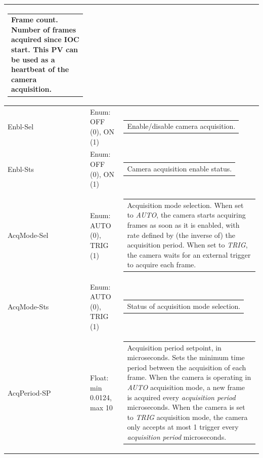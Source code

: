 \documentclass[openany]{article}
\begin{document}
\begin{longtable}{| m{3.0cm} m{4.5cm}  m{7.0cm} |}
\begin{tabular}{@{}m{6cm}@{}}
                Frame count. Number of frames acquired since IOC start. This PV
                can be used as a heartbeat of the camera acquisition.
            \end{tabular} \hypertarget{pv:enbl}{}\\ \hline
        Enbl-Sel & Enum: OFF (0), ON (1) & \begin{tabular}{@{}m{6cm}@{}}
                Enable/disable camera acquisition.
            \end{tabular} \\ \hline
        Enbl-Sts & Enum: OFF (0), ON (1) & \begin{tabular}{@{}m{6cm}@{}}
                Camera acquisition enable status.
            \end{tabular} \hypertarget{pv:acq-mode}{}\\ \hline
        AcqMode-Sel & Enum: AUTO (0), TRIG (1) & \begin{tabular}{@{}m{6cm}@{}}
                Acquisition mode selection. When set to \emph{AUTO}, the camera
                starts acquiring frames as soon as it is enabled, with rate defined
                by (the inverse of) the acquisition period. When set to \emph{TRIG},
                the camera waits for an external trigger to acquire each frame.
            \end{tabular} \\ \hline
        AcqMode-Sts & Enum: AUTO (0), TRIG (1) & \begin{tabular}{@{}m{6cm}@{}}
                Status of acquisition mode selection.
            \end{tabular} \hypertarget{pv:acq-period}{}\\ \hline
        AcqPeriod-SP & Float: min 0.0124, max 10 & \begin{tabular}{@{}m{6cm}@{}}
                Acquisition period setpoint, in microseconds. Sets the minimum time period
                between the acquisition of each frame. When the camera is operating in 
                \emph{AUTO} acquisition mode, a new frame is acquired every 
                \emph{acquisition period} microseconds. When the camera is set to
                \emph{TRIG} acquisition mode, the camera only accepts at most 1
                trigger every \emph{acquisition period} microseconds.
            \end{tabular} \\ \hline

\end{longtable}
\end{document}
